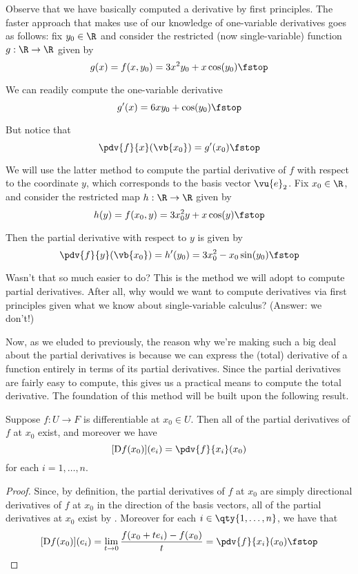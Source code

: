Observe that we have basically computed a derivative by first principles. The faster approach that makes use of our knowledge of one-variable derivatives goes as follows: fix \( y_0\in\R \) and consider the restricted (now single-variable) function \( g:\R\to\R \) given by
\[ g(x)=f(x,y_0)=3x^2y_0+x\cos(y_0)\fstop \]

We can readily compute the one-variable derivative
\[ g'(x)=6xy_0+\cos(y_0)\fstop \]

But notice that
\[ {\pdv{f}{x}}(\vb{x_0})=g'(x_0)\fstop \]

We will use the latter method to compute the partial derivative of \( f \) with respect to the coordinate \( y \), which corresponds to the basis vector \( \vu{e}_2 \). Fix \( x_0\in\R \), and consider the restricted map \( h:\R\to\R \) given by
\[ h(y)=f(x_0,y)=3x_0^2y+x\cos(y)\fstop \]

Then the partial derivative with respect to \( y \) is given by
\[ {\pdv{f}{y}}(\vb{x_0})=h'(y_0)=3x_0^2-x_0\sin(y_0)\fstop \]

Wasn't that so much easier to do? This is the method we will adopt to compute partial derivatives. After all, why would we want to compute derivatives via first principles given what we know about single-variable calculus? (Answer: we don't!)

\vspace{3mm}

Now, as we eluded to previously, the reason why we're making such a big deal about the partial derivatives is because we can express the (total) derivative of a function entirely in terms of its partial derivatives. Since the partial derivatives are fairly easy to compute, this gives us a practical means to compute the total derivative. The foundation of this method will be built upon the following result.

\begin{corollary}
  Suppose \( f:U\to F \) is differentiable at \( x_0\in U \). Then all of the partial derivatives of \( f \) at \( x_0 \) exist, and moreover we have
  \[ [\D f(x_0)](e_i)={\pdv{f}{x_i}}(x_0) \]
  for each \( i=1,\dots, n \).
\end{corollary}
\begin{proof}
  Since, by definition, the partial derivatives of \( f \) at \( x_0 \) are simply directional derivatives of \( f \) at \( x_0 \) in the direction of the basis vectors, all of the partial derivatives at \( x_0 \) exist by . Moreover for each \( i\in\qty{1,\dots,n} \), we have that
  \[ [\D f(x_0)](e_i)=\lim_{t\to 0}\frac{f(x_0+te_i)-f(x_0)}{t}={\pdv{f}{x_i}} (x_0)\fstop \]
\end{proof}

